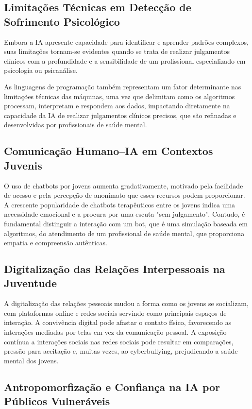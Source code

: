 \documentclass[12pt]{article}
\begin{document}
\subsection{Limitações Técnicas em Detecção de Sofrimento Psicológico}

Embora a IA apresente capacidade para identificar e aprender padrões complexos, suas limitações tornam-se evidentes quando se trata de realizar julgamentos clínicos com a profundidade e a sensibilidade de um profissional especializado em psicologia ou psicanálise.\cite{conex2023} 

As linguagens de programação também representam um fator determinante nas limitações técnicas das máquinas, uma vez que delimitam como os algoritmos processam, interpretam e respondem aos dados, impactando diretamente na capacidade da IA de realizar julgamentos clínicos precisos, que são refinadas e desenvolvidas por profissionais de saúde mental. 

\subsection{Comunicação Humano–IA em Contextos Juvenis}

O uso de chatbots por jovens aumenta gradativamente, motivado pela facilidade de acesso e pela percepção de anonimato que esses recursos podem proporcionar. A crescente popularidade de chatbots terapêuticos entre os jovens indica uma necessidade emocional e a procura por uma escuta "sem julgamento". Contudo, é fundamental distinguir a interação com um bot, que é uma simulação baseada em algoritmos, do atendimento de um profissional de saúde mental, que proporciona empatia e compreensão autênticas. \cite{g12024}
\subsection{Digitalização das Relações Interpessoais na Juventude}

A digitalização das relações pessoais mudou a forma como os jovens se socializam, com plataformas online e redes sociais servindo como principais espaços de interação. A convivência digital pode afastar o contato físico, favorecendo as interações mediadas por telas em vez da comunicação pessoal. A exposição contínua a interações sociais nas redes sociais pode resultar em comparações, pressão para aceitação e, muitas vezes, ao cyberbullying, prejudicando a saúde mental dos jovens. \cite{geo2025}
\subsection{Antropomorfização e Confiança na IA por Públicos Vulneráveis}
\end{document}
